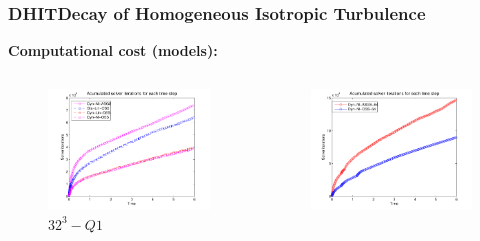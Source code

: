 \begin{frame}
\frametitle{DHIT{\small Decay of Homogeneous Isotropic Turbulence}}
\textbf{Computational cost (models):}
 \vspace*{-1.0cm}
 \begin{columns}
 \begin{column}{0.5\textwidth}
 \begin{figure}
  \centering
  \includegraphics[width=1.1\textwidth]{Figures/Acsoliter_32_scaled_cnvgd}
      \vspace*{-0.8cm}
  \caption{$32^3-Q1$}
  \end{figure}
  \end{column}
  \begin{column}{0.5\textwidth}
   \begin{figure}
  \centering
  \includegraphics[width=1.1\textwidth]{Figures/Acsoliter_64}

\end{figure}
\end{column}
\end{columns}
\end{frame}
